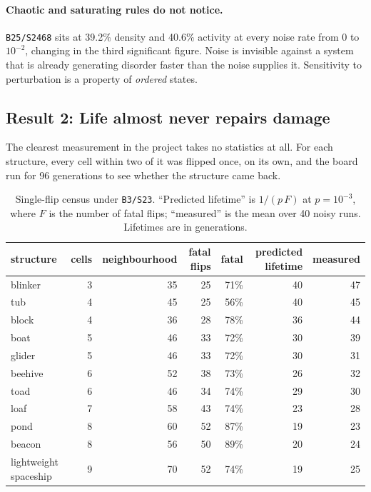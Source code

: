 \documentclass[11pt]{article}
\newcommand{\rulename}[1]{\texttt{#1}}
\begin{document}
\paragraph{Chaotic and saturating rules do not notice.} \rulename{B25/S2468} sits at 39.2\% density
and 40.6\% activity at every noise rate from $0$ to $10^{-2}$, changing in the third significant
figure. Noise is invisible against a system that is already generating disorder faster than the noise
supplies it. Sensitivity to perturbation is a property of \emph{ordered} states.

\subsection{Result 2: Life almost never repairs damage}

The clearest measurement in the project takes no statistics at all. For each structure, every cell
within two of it was flipped once, on its own, and the board run for 96 generations to see whether
the structure came back.

\begin{table}[h]
\centering
\small
\begin{tabular}{lrrrrrr}
\toprule
structure & cells & neighbourhood & fatal flips & fatal & predicted lifetime & measured \\
\midrule
blinker & 3 & 35 & 25 & 71\% & 40 & 47 \\
tub & 4 & 45 & 25 & 56\% & 40 & 45 \\
block & 4 & 36 & 28 & 78\% & 36 & 44 \\
boat & 5 & 46 & 33 & 72\% & 30 & 39 \\
glider & 5 & 46 & 33 & 72\% & 30 & 31 \\
beehive & 6 & 52 & 38 & 73\% & 26 & 32 \\
toad & 6 & 46 & 34 & 74\% & 29 & 30 \\
loaf & 7 & 58 & 43 & 74\% & 23 & 28 \\
pond & 8 & 60 & 52 & 87\% & 19 & 23 \\
beacon & 8 & 56 & 50 & 89\% & 20 & 24 \\
lightweight spaceship & 9 & 70 & 52 & 74\% & 19 & 25 \\
\bottomrule
\end{tabular}
\caption{Single-flip census under \rulename{B3/S23}. ``Predicted lifetime'' is $1/(p\,F)$ at
$p=10^{-3}$, where $F$ is the number of fatal flips; ``measured'' is the mean over 40 noisy runs.
Lifetimes are in generations.}
\end{table}
\end{document}
